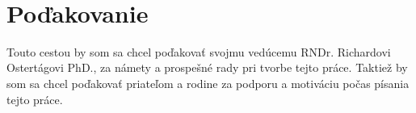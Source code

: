 ~\vfill
\section*{Poďakovanie}
Touto cestou by som sa chcel poďakovať svojmu vedúcemu RNDr. Richardovi Ostertágovi PhD., za námety a prospešné rady pri tvorbe tejto práce. Taktiež by som sa chcel poďakovať priateľom a rodine za podporu a motiváciu počas písania tejto práce. 

\vspace{3cm}
